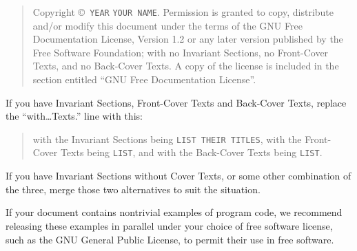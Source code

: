 \begin{quote}
  Copyright \copyright\ \texttt{YEAR} \texttt{YOUR NAME}. Permission
  is granted to copy, distribute and/or modify this document under the
  terms of the GNU Free Documentation License, Version 1.2 or any
  later version published by the Free Software Foundation; with no
  Invariant Sections, no Front-Cover Texts, and no Back-Cover Texts.
  A copy of the license is included in the section entitled ``GNU Free
  Documentation License''.
\end{quote}

If you have Invariant Sections, Front-Cover Texts and Back-Cover
Texts, replace the ``with\ldots{}Texts.'' line with this:

\begin{quote}
  with the Invariant Sections being \texttt{LIST THEIR TITLES}, with
  the Front-Cover Texts being \texttt{LIST}, and with the Back-Cover
  Texts being \texttt{LIST}.
\end{quote}

If you have Invariant Sections without Cover Texts, or some other
combination of the three, merge those two alternatives to suit the
situation.

If your document contains nontrivial examples of program code, we
recommend releasing these examples in parallel under your choice of
free software license, such as the GNU General Public License, to
permit their use in free software.

